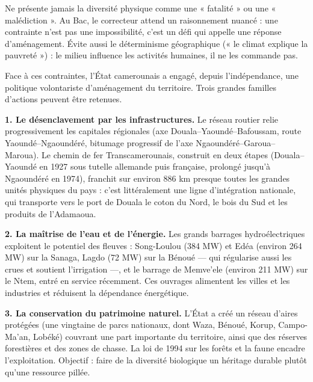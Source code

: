 \documentclass[11pt]{article}
\newcommand{\cle}[1]{{\popxbold\color{popdark}#1}}
\newcounter{popsec}
\newcounter{popsub}
\newcommand{\courssub}[1]{%
  \stepcounter{popsub}%
  \par\vspace{9pt}\noindent{\popxbold\fontsize{11.5}{13}\selectfont\color{popink}{\color{poporange}\thepopsec.\thepopsub}\hspace{6pt}#1}\par\nopagebreak\vspace{4pt}
}
\begin{document}
\begin{attention}
Ne présente jamais la diversité physique comme une « fatalité » ou une « malédiction ». Au Bac, le correcteur attend un raisonnement nuancé : une contrainte n'est pas une impossibilité, c'est un défi qui appelle une réponse d'aménagement. Évite aussi le déterminisme géographique (« le climat explique la pauvreté ») : le milieu influence les activités humaines, il ne les commande pas.
\end{attention}

\courssub{Les réponses de l'État : aménager pour unir}

Face à ces contraintes, l'État camerounais a engagé, depuis l'indépendance, une politique volontariste d'aménagement du territoire. Trois grandes familles d'actions peuvent être retenues.

\textbf{1. Le désenclavement par les infrastructures.} Le réseau routier relie progressivement les capitales régionales (axe Douala--Yaoundé--Bafoussam, route Yaoundé--Ngaoundéré, bitumage progressif de l'axe Ngaoundéré--Garoua--Maroua). Le chemin de fer \cle{Transcamerounais}, construit en deux étapes (Douala--Yaoundé en 1927 sous tutelle allemande puis française, prolongé jusqu'à Ngaoundéré en 1974), franchit sur environ \num{886} km presque toutes les grandes unités physiques du pays : c'est littéralement une ligne d'intégration nationale, qui transporte vers le port de Douala le coton du Nord, le bois du Sud et les produits de l'Adamaoua.

\textbf{2. La maîtrise de l'eau et de l'énergie.} Les grands barrages hydroélectriques exploitent le potentiel des fleuves : Song-Loulou (384 MW) et Edéa (environ 264 MW) sur la Sanaga, Lagdo (72 MW) sur la Bénoué — qui régularise aussi les crues et soutient l'irrigation —, et le barrage de Memve'ele (environ 211 MW) sur le Ntem, entré en service récemment. Ces ouvrages alimentent les villes et les industries et réduisent la dépendance énergétique.

\textbf{3. La conservation du patrimoine naturel.} L'État a créé un réseau d'aires protégées (une vingtaine de parcs nationaux, dont Waza, Bénoué, Korup, Campo-Ma'an, Lobéké) couvrant une part importante du territoire, ainsi que des réserves forestières et des zones de chasse. La loi de 1994 sur les forêts et la faune encadre l'exploitation. Objectif : faire de la diversité biologique un héritage durable plutôt qu'une ressource pillée.
\end{document}
